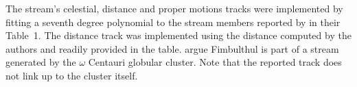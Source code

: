 The stream's celestial, distance and proper motions tracks were implemented by fitting a seventh degree polynomial to the stream members reported by \citet{Ibata2021} in their Table~1. The distance track was implemented using the distance computed by the authors and readily provided in the table. \citet{Ibata2019_OCen} argue Fimbulthul is part of a stream generated by the $\omega$ Centauri globular cluster. Note that the reported track does not link up to the cluster itself.
